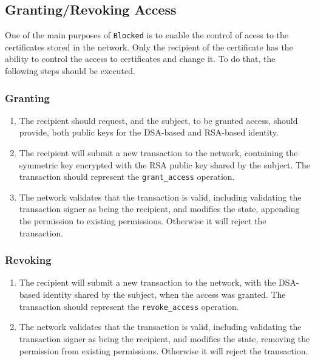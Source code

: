 \subsection{Granting/Revoking Access}

One of the main purposes of \texttt{Blocked} is to enable the control of acess to the certificates stored in the network. Only the recipient of the certificate has the ability to control the access to certificates and change it. To do that, the following steps should be executed.

\subsubsection{Granting}

\begin{enumerate}
	\item The recipient should request, and the subject, to be granted access, should provide, both public keys for the DSA-based and RSA-based identity.
	\item The recipient will submit a new transaction to the network, containing the symmetric key encrypted with the RSA public key shared by the subject. The transaction should represent the \texttt{grant\_access} operation.
	\item The network validates that the transaction is valid, including validating the transaction signer as being the recipient, and modifies the state, appending the permission to existing permissions. Otherwise it will reject the transaction.
\end{enumerate}

\subsubsection{Revoking}

\begin{enumerate}
	\item The recipient will submit a new transaction to the network, with the DSA-based identity shared by the subject, when the access was granted. The transaction should represent the \texttt{revoke\_access} operation.
	\item The network validates that the transaction is valid, including validating the transaction signer as being the recipient, and modifies the state, removing the permission from existing permissions. Otherwise it will reject the transaction.
\end{enumerate}

